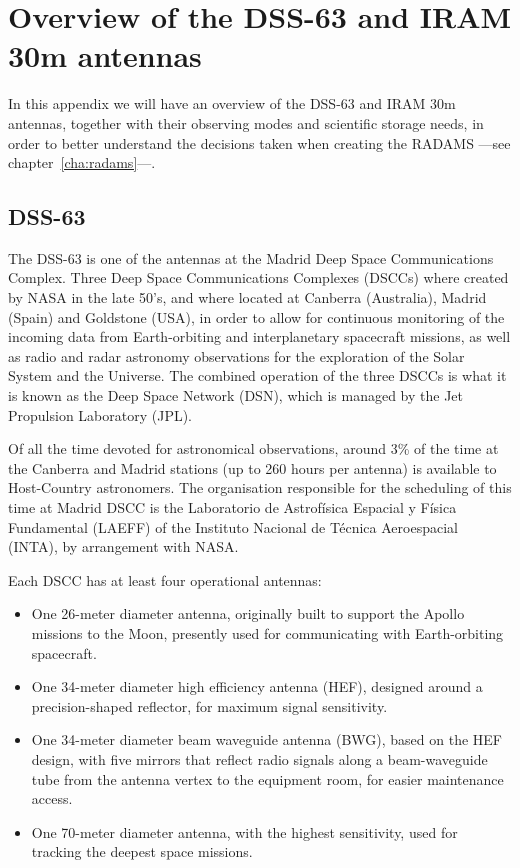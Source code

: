 \chapter{Overview of the DSS-63 and IRAM 30m antennas} %
\label{cha:overview_of_the_dss_63_and_iram_30m_antennas}

In this appendix we will have an overview of the DSS-63 and IRAM 30m
antennas, together with their observing modes and scientific storage
needs, in order to better understand the decisions taken when creating
the RADAMS ---see chapter~\ref{cha:radams}---.

\section{DSS-63} %
\label{sec:dss_63}

The DSS-63 is one of the antennas at the Madrid Deep Space
Communications Complex. Three Deep Space Communications Complexes
(DSCCs) where created by NASA in the late 50’s, and where located at
Canberra (Australia), Madrid (Spain) and Goldstone (USA), in order to
allow for continuous monitoring of the incoming data from
Earth-orbiting and interplanetary spacecraft missions, as well as
radio and radar astronomy observations for the exploration of the
Solar System and the Universe. The combined operation of the three
DSCCs is what it is known as the Deep Space Network (DSN), which is
managed by the Jet Propulsion Laboratory (JPL).

Of all the time devoted for astronomical observations, around 3\% of
the time at the Canberra and Madrid stations (up to 260 hours per
antenna) is available to Host-Country astronomers. The organisation
responsible for the scheduling of this time at Madrid DSCC is the
Laboratorio de Astrofísica Espacial y Física Fundamental (LAEFF) of
the Instituto Nacional de Técnica Aeroespacial (INTA), by arrangement
with NASA.

Each DSCC has at least four operational antennas:

\begin{itemize}
	\item One 26-meter diameter antenna, originally built to
          support the Apollo missions to the Moon, presently used for
          communicating with Earth-orbiting spacecraft.
	
	\item One 34-meter diameter high efficiency antenna (HEF),
          designed around a precision-shaped reflector, for maximum
          signal sensitivity.
	
	\item One 34-meter diameter beam waveguide antenna (BWG),
          based on the HEF design, with five mirrors that reflect radio
          signals along a beam-waveguide tube from the antenna vertex
          to the equipment room, for easier maintenance access.
	
	\item One 70-meter diameter antenna, with the highest
          sensitivity, used for tracking the deepest space missions.
\end{itemize}

